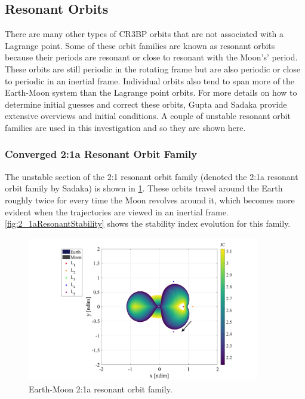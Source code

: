 \subsection{Resonant Orbits}
There are many other types of CR3BP orbits that are not associated with a Lagrange point. Some of
these orbit families are known as resonant orbits because their periods are resonant or close to
resonant with the Moon's' period. These orbits are still periodic in the rotating frame but are
also periodic or close to periodic in an inertial frame. Individual orbits also tend to span more
of the Earth-Moon system than the Lagrange point orbits. For more details on how to determine
initial guesses and correct these orbits, Gupta\cite{Gupta:2020} and Sadaka\cite{Sadaka:2023}
provide extensive overviews and initial conditions. A couple of unstable resonant orbit families
are used in this investigation and so they are shown here.

\subsubsection{Converged 2:1a Resonant Orbit Family}
The unstable section of the 2:1 resonant orbit family (denoted the 2:1a resonant orbit family by
Sadaka) is shown in \cref{fig:2_1aResonant}\cite{Sadaka:2023}. These orbits travel around the
Earth roughly twice for every time the Moon revolves around it, which becomes more evident when
the trajectories are viewed in an inertial frame. \cref{fig:2_1aResonantStability} shows the
stability index evolution for this family.

\begin{figure}[ht]
    \centering
    \includegraphics[width=0.9\textwidth]{figures/Resonant2_1aFamily.pdf}
    \caption{Earth-Moon 2:1a resonant orbit family.}
    \label{fig:2_1aResonant}
\end{figure}

